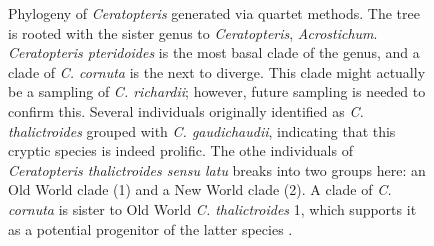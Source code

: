 \documentclass[12pt]{article}
\begin{document}
\begin{figure}[H]
\centering
\caption{Phylogeny of \textit{Ceratopteris} generated via quartet methods. The tree is rooted with the sister genus to \textit{Ceratopteris}, \textit{Acrostichum}. \textit{Ceratopteris pteridoides} is the most basal clade of the genus, and a clade of \textit{C. cornuta} is the next to diverge. This clade might actually be a sampling of \textit{C. richardii}; however, future sampling is needed to confirm this. Several individuals originally identified as \textit{C. thalictroides} grouped with \textit{C. gaudichaudii}, indicating that this cryptic species is indeed prolific. The othe individuals of \textit{Ceratopteris thalictroides sensu latu} breaks into two groups here: an Old World clade (1) and a New World clade (2). A clade of \textit{C. cornuta} is sister to Old World \textit{C. thalictroides} 1, which supports it as a potential progenitor of the latter species \autocite{Adjie2007}.}
\label{phy}
\end{figure}

\vspace{30cm}
\printbibliography
\end{document}

